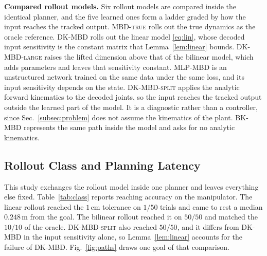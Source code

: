 \documentclass[letterpaper,10pt,conference]{ieeeconf}
\newcommand{\mbdtrue}{\textsc{MBD-true}}
\newcommand{\dkmbd}{\textsc{DK-MBD}}
\newcommand{\dksplit}{\textsc{DK-MBD-split}}
\newcommand{\bkmbd}{\textsc{BK-MBD}}
\newcommand{\dklarge}{\textsc{DK-MBD-large}}
\newcommand{\mlpmbd}{\textsc{MLP-MBD}}
\begin{document}
\textbf{Compared rollout models.}
Six rollout models are compared inside the identical planner, and the five learned ones form a ladder graded by how the input reaches the tracked output.
\mbdtrue{} rolls out the true dynamics as the oracle reference.
\dkmbd{} rolls out the linear model \eqref{eq:lin}, whose decoded input sensitivity is the constant matrix that Lemma~\ref{lem:linear} bounds.
\dklarge{} raises the lifted dimension above that of the bilinear model, which adds parameters and leaves that sensitivity constant.
\mlpmbd{} is an unstructured network trained on the same data under the same loss, and its input sensitivity depends on the state.
\dksplit{} applies the analytic forward kinematics to the decoded joints, so the input reaches the tracked output outside the learned part of the model.
It is a diagnostic rather than a controller, since Sec.~\ref{subsec:problem} does not assume the kinematics of the plant.
\bkmbd{} represents the same path inside the model and asks for no analytic kinematics.

\subsection{Rollout Class and Planning Latency}\label{subsec:exp_class}

This study exchanges the rollout model inside one planner and leaves everything else fixed.
Table~\ref{tab:class} reports reaching accuracy on the manipulator.
The linear rollout reached the $1$\,cm tolerance on $1/50$ trials and came to rest a median $0.248$\,m from the goal.
The bilinear rollout reached it on $50/50$ and matched the $10/10$ of the oracle.
\dksplit{} also reached $50/50$, and it differs from \dkmbd{} in the input sensitivity alone, so Lemma~\ref{lem:linear} accounts for the failure of \dkmbd{}.
Fig.~\ref{fig:paths} draws one goal of that comparison.
\end{document}
